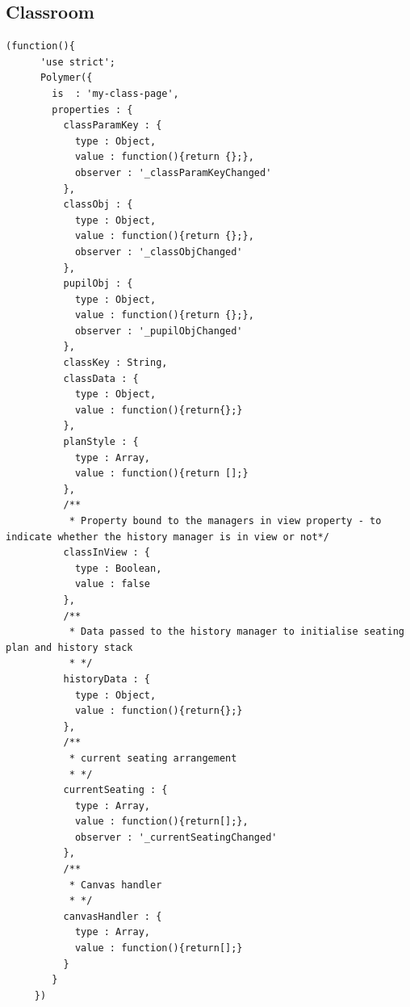 \subsection{Classroom}
\begin{lstlisting}[caption={}, label={lst:}]
    (function(){
      'use strict';
      Polymer({
        is  : 'my-class-page',
        properties : {
          classParamKey : {
            type : Object,
            value : function(){return {};},
            observer : '_classParamKeyChanged'
          },
          classObj : {
            type : Object,
            value : function(){return {};},
            observer : '_classObjChanged'
          },
          pupilObj : {
            type : Object,
            value : function(){return {};},
            observer : '_pupilObjChanged'
          },
          classKey : String,
          classData : {
            type : Object,
            value : function(){return{};}
          },
          planStyle : {
            type : Array,
            value : function(){return [];}
          },
          /**
           * Property bound to the managers in view property - to indicate whether the history manager is in view or not*/
          classInView : {
            type : Boolean,
            value : false
          },
          /**
           * Data passed to the history manager to initialise seating plan and history stack
           * */
          historyData : {
            type : Object,
            value : function(){return{};}
          },
          /**
           * current seating arrangement
           * */
          currentSeating : {
            type : Array,
            value : function(){return[];},
            observer : '_currentSeatingChanged'
          },
          /**
           * Canvas handler
           * */
          canvasHandler : {
            type : Array,
            value : function(){return[];}
          }
        }
     })
\end{lstlisting}

